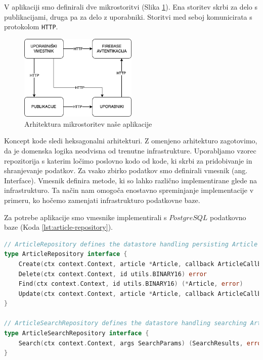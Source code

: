 \documentclass[a4paper, 12pt]{book}
\begin{document}
V aplikaciji smo definirali dve mikrostoritvi (Slika \ref{app-architecture}). Ena storitev skrbi za delo s publikacijami, druga pa za delo z uporabniki. Storitvi med seboj komunicirata s protokolom \verb=HTTP=.

\begin{figure}[h]
\begin{center}
\includegraphics[width=0.5\textwidth]{slike/architecture.png}
\end{center}
\caption{ Arhitektura mikrostoritev naše aplikacije }
\label{app-architecture}
\end{figure}



Koncept kode sledi heksagonalni arhitekturi. Z omenjeno arhitekturo zagotovimo, da je domenska logika neodvisna od trenutne infrastrukture. Uporabljamo vzorec repozitorija s katerim ločimo poslovno kodo od kode, ki skrbi za pridobivanje in shranjevanje podatkov. Za vsako zbirko podatkov smo definirali vmesnik (ang. Interface). Vmesnik definira metode, ki so lahko različno implementirane glede na infrastrukturo. Ta način nam omogoča enostavno spreminjanje implementacije v primeru, ko hočemo zamenjati infrastrukturo podatkovne baze. 

Za potrebe aplikacije smo vmesnike implementirali s $PostgreSQL$ podatkovno baze (Koda \ref{lst:article-repository}). 
\begin{lstlisting}[language=go, style=mystyle,caption={Vmesnik, ki definira repozitorij za publikacije},label=lst:article-repository]
// ArticleRepository defines the datastore handling persisting Article records.
type ArticleRepository interface {
	Create(ctx context.Context, article *Article, callback ArticleCallbackFn) (*Article, error)
	Delete(ctx context.Context, id utils.BINARY16) error
	Find(ctx context.Context, id utils.BINARY16) (*Article, error)
	Update(ctx context.Context, article *Article, callback ArticleCallbackFn) (*Article, error)
}

// ArticleSearchRepository defines the datastore handling searching Article records.
type ArticleSearchRepository interface {
	Search(ctx context.Context, args SearchParams) (SearchResults, error)
}
\end{lstlisting}
\end{document}
